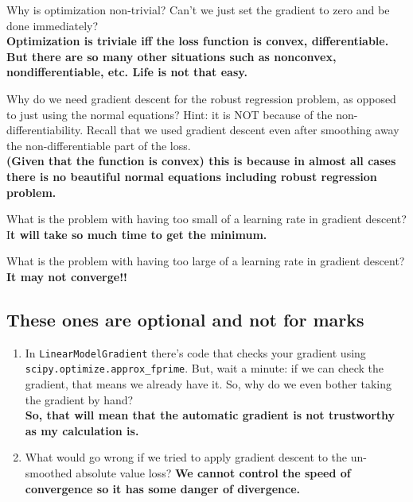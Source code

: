 \documentclass{article}
\def\enum#1{\begin{enumerate}#1\end{enumerate}}
\begin{document}
{\item Why is optimization non-trivial? Can't we just set the gradient to zero and be done immediately?\\
\textbf{Optimization is triviale iff the loss function is convex, differentiable. But there are so many other situations such as nonconvex, nondifferentiable, etc. Life is not that easy.}\\
\item Why do we need gradient descent for the robust regression problem, as opposed to just using the normal equations? Hint: it is NOT because of the non-differentiability. Recall that we used gradient descent even after smoothing away the non-differentiable part of the loss.\\
\textbf{(Given that the function is convex) this is because in almost all cases there is no beautiful normal equations including robust regression problem. }
\item What is the problem with having too small of a learning rate in gradient descent?\\
I\textbf{t will take so much time to get the minimum.}
\item What is the problem with having too large of a learning rate in gradient descent?\\\textbf{It may not converge!!}
}



\subsection{These ones are optional and not for marks}

\enum{
\item In \texttt{LinearModelGradient} there's code that checks your gradient using \texttt{scipy.optimize.approx\_fprime}. But, wait a minute: if we can check the gradient, that means we already have it. So, why do we even bother taking the gradient by hand?\\
\textbf{So, that will mean that the automatic gradient is not trustworthy as my calculation is. }\\
\item What would go wrong if we tried to apply gradient descent to the un-smoothed absolute value loss?
\textbf{We cannot control the speed of convergence so it has some danger of divergence.}
}
\end{document}
